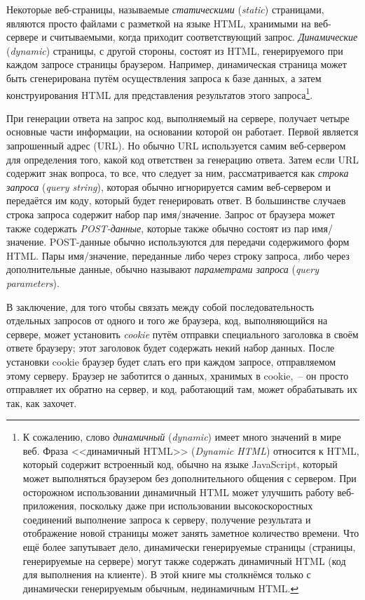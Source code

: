 Некоторые веб-страницы, называемые \textit{статическими} (\textit{static}) страницами,
являются просто файлами с разметкой на языке HTML, хранимыми на веб-сервере и считываемыми,
когда приходит соответствующий запрос. \textit{Динамические} (\textit{dynamic}) страницы,
с другой стороны, состоят из HTML, генерируемого при каждом запросе страницы
браузером. Например, динамическая страница может быть сгенерирована путём осуществления
запроса к базе данных, а затем конструирования HTML для представления результатов этого
запроса\footnote{К сожалению, слово \textit{динамичный} (\textit{dynamic}) имеет много
  значений в мире веб. Фраза <<динамичный HTML>> (\textit{Dynamic HTML}) относится к HTML,
  который содержит встроенный код, обычно на языке JavaScript, который может выполняться
  браузером без дополнительного общения с сервером. При осторожном использовании
  динамичный HTML может улучшить работу веб-приложения, поскольку даже при использовании
  высокоскоростных соединений выполнение запроса к серверу, получение результата и
  отображение новой страницы может занять заметное количество времени. Что ещё более
  запутывает дело, динамически генерируемые страницы (страницы, генерируемые на сервере)
  могут также содержать динамичный HTML (код для выполнения на клиенте). В этой книге мы
  столкнёмся только с динамически генерируемым обычным, нединамичным HTML.}.

При генерации ответа на запрос код, выполняемый на сервере, получает четыре основные
части информации, на основании которой он работает. Первой является запрошенный адрес
(URL). Но обычно URL используется самим веб-сервером для определения того, какой код
ответствен за генерацию ответа. Затем если URL содержит знак вопроса, то все, что
следует за ним, рассматривается как \textit{строка запроса} (\textit{query string}),
которая обычно игнорируется самим веб-сервером и передаётся им коду, который будет
генерировать ответ. В большинстве случаев строка запроса содержит набор пар
имя/значение. Запрос от браузера может также содержать \textit{POST-данные}, которые также
обычно состоят из пар имя/значение. POST-данные обычно используются для передачи
содержимого форм HTML. Пары имя/значение, переданные либо через строку запроса, либо через
дополнительные данные, обычно называют \textit{параметрами запроса} (\textit{query
  parameters}).

В заключение, для того чтобы связать между собой последовательность отдельных запросов от
одного и того же браузера, код, выполняющийся на сервере, может установить \textit{cookie}
путём отправки специального заголовка в своём ответе браузеру; этот заголовок будет
содержать некий набор данных. После установки cookie браузер будет слать его при каждом
запросе, отправляемом этому серверу. Браузер не заботится о данных, хранимых в cookie,~--
он просто отправляет их обратно на сервер, и код, работающий там, может обрабатывать их
так, как захочет.

